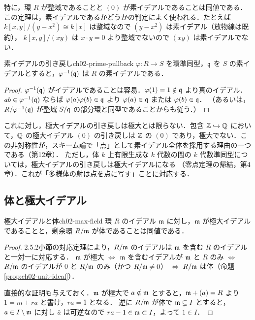 特に，環 $R$ が整域であることと $(0)$ が素イデアルであることは同値である．
この定理は，素イデアルであるかどうかの判定によく使われる．たとえば
$k[x,y]/(y-x^2)\cong k[x]$ は整域なので $(y-x^2)$ は素イデアル（放物線は既約），
$k[x,y]/(xy)$ は $x\cdot y=0$ より整域でないので $(xy)$ は素イデアルでない．

\begin{myprop}{素イデアルの引き戻し}{ch02-prime-pullback}
$\varphi:R\to S$ を環準同型，$\mathfrak{q}$ を $S$ の素イデアルとすると，$\varphi^{-1}(\mathfrak{q})$ は $R$ の素イデアルである．
\end{myprop}

\begin{proof}
$\varphi^{-1}(\mathfrak{q})$ がイデアルであることは容易．$\varphi(1)=1\notin\mathfrak{q}$ より真のイデアル．
$ab\in\varphi^{-1}(\mathfrak{q})$ ならば $\varphi(a)\varphi(b)\in\mathfrak{q}$ より $\varphi(a)\in\mathfrak{q}$ または $\varphi(b)\in\mathfrak{q}$．
（あるいは，$R/\varphi^{-1}(\mathfrak{q})$ が整域 $S/\mathfrak{q}$ の部分環と同型であることからも従う．）
\end{proof}

これに対し，極大イデアルの引き戻しは極大とは限らない．包含 $\mathbb{Z}\hookrightarrow\mathbb{Q}$ において，$\mathbb{Q}$ の極大イデアル $(0)$ の引き戻しは
$\mathbb{Z}$ の $(0)$ であり，極大でない．この非対称性が，スキーム論で「点」として素イデアル全体を採用する理由の一つである（第12章）．
ただし，体 $k$ 上有限生成な $k$ 代数の間の $k$ 代数準同型については，極大イデアルの引き戻しは極大イデアルになる
（零点定理の帰結，第4章）．これが「多様体の射は点を点に写す」ことに対応する．

\subsection{体と極大イデアル}

\begin{mythm}{極大イデアルと体}{ch02-max-field}
環 $R$ のイデアル $\mathfrak{m}$ に対し，$\mathfrak{m}$ が極大イデアルであることと，剰余環 $R/\mathfrak{m}$ が体であることは同値である．
\end{mythm}

\begin{proof}
2.5.2小節の対応定理により，$R/\mathfrak{m}$ のイデアルは $\mathfrak{m}$ を含む $R$ のイデアルと一対一に対応する．
$\mathfrak{m}$ が極大 $\iff$ $\mathfrak{m}$ を含むイデアルが $\mathfrak{m}$ と $R$ のみ $\iff$ $R/\mathfrak{m}$ のイデアルが $0$ と $R/\mathfrak{m}$ のみ（かつ $R/\mathfrak{m}\ne0$）
$\iff$ $R/\mathfrak{m}$ は体（命題\ref{prop:ch02-unit-ideal}）．

直接的な証明も与えておく．$\mathfrak{m}$ が極大で $a\notin\mathfrak{m}$ とすると，$\mathfrak{m}+(a)=R$ より $1=m+ra$ と書け，$\bar r\bar a=\bar1$ となる．
逆に $R/\mathfrak{m}$ が体で $\mathfrak{m}\subsetneq I$ とすると，$a\in I\setminus\mathfrak{m}$ に対し $\bar a$ は可逆なので $ra-1\in\mathfrak{m}\subset I$，よって $1\in I$．
\end{proof}

